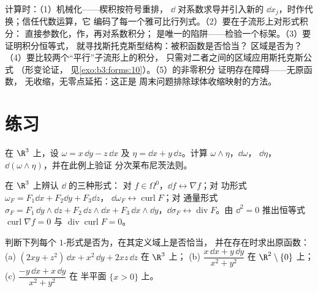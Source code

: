 \begin{method}\label{met:b3:forms:method}
计算时：（1）机械化——楔积按符号重排，
$\dd$ 对系数求导并引入新的 $\dd
x_j$，时作代换；信任代数运算，它
编码了每一个雅可比行列式。（2）要在子流形上对形式积分：
直接参数化，作，再对系数积分；
是唯一的陷阱——检验一个标架。（3）要证明积分恒等式，
就寻找斯托克斯型结构：被积函数是否恰当？
区域是否为？（4）要比较两个“平行”子流形上的积分，
只需对二者之间的区域应用斯托克斯公式
（形变论证，
见\cref{exo:b3:forms:10}）。（5）的非零积分
证明存在障碍——无原函数，
无收缩，无零点延拓：这正是
周末问题排除球体收缩映射的方法。
\end{method}

\section{练习}

\begin{exercise}[$\star$]\label{exo:b3:forms:1}
在 $\R^3$ 上，设 $\omega = x\,\dd y - z\,\dd x$ 及 $\eta =
\dd x + y\,\dd z$。计算 $\omega\wedge\eta$，$\dd\omega$，
$\dd\eta$，$\dd(\omega\wedge\eta)$，并在此例上验证
分次莱布尼茨法则。
\end{exercise}

\begin{exercise}[$\star$]\label{exo:b3:forms:2}
在 $\R^3$ 上辨认 $\dd$ 的三种形式：
对 $f \in \Omega^0$，$\dd f \leftrightarrow \nabla f$；对
功形式 $\omega_F = F_1\dd x + F_2\dd y + F_3\dd z$，
$\dd\omega_F \leftrightarrow \operatorname{curl}F$；对
通量形式 $\sigma_F = F_1\,\dd y\wedge\dd z + F_2\,\dd
z\wedge\dd x + F_3\,\dd x\wedge\dd y$，$\dd\sigma_F
\leftrightarrow \operatorname{div}F$。由 $\dd^2 =
0$ 推出恒等式 $\operatorname{curl}\nabla f = 0$ 与
$\operatorname{div}\operatorname{curl}F = 0$。
\end{exercise}

\begin{exercise}[$\star\star$]\label{exo:b3:forms:3}
判断下列每个 $1$-形式是否为，在其定义域上是否恰当，
并在存在时求出原函数：
(a) $(2xy + z^2)\,\dd x + x^2\,\dd y + 2xz\,\dd z$ 在
$\R^3$ 上；
(b) $\dfrac{x\,\dd x + y\,\dd y}{x^2 + y^2}$ 在
$\R^2\setminus\{0\}$ 上；
(c) $\dfrac{-y\,\dd x + x\,\dd y}{x^2 + y^2}$ 在
半平面 $\{x > 0\}$ 上。
\end{exercise}

